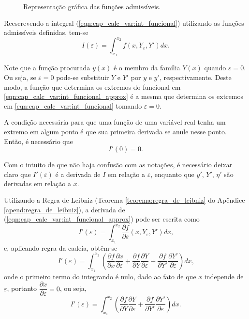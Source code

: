 \documentclass[
	12pt,				%
	openright,			%
    twoside,			%
	a4paper,			%
	english,			%
	french,				%
	spanish,			%
	brazil				%
	]{abntex2}
\numberwithin{lema}{chapter}
\numberwithin{teorema}{chapter}
\numberwithin{definicao}{chapter}
\numberwithin{exemplo}{chapter}
\numberwithin{figure}{chapter}
\begin{document}
\begin{figure}[!h]
	\caption{Representação gráfica das funções admissíveis.}
	\centering
	
	\resizebox{0.75\textwidth}{!}
	{
		
	}
	
	\label{fig:funcoes_admissiveis}
\end{figure}

Reescrevendo a integral (\ref{eqn:cap_calc_var:int_funcional}) utilizando as funções admissíveis definidas, tem-se
\begin{equation}\label{eqn:cap_calc_var:int_funcional_approx}
I(\varepsilon)=\int_{x_1}^{x_2}f(x, Y_{\varepsilon}, Y')dx\text{.}
\end{equation}

Note que a função procurada $y(x)$ é o membro da família $Y(x)$ quando $\varepsilon = 0$. Ou seja, se $\varepsilon = 0$ pode-se substituir $Y$ e $Y'$ por $y$ e $y'$, respectivamente. Deste modo, a função que determina os extremos do funcional em \eqref{eqn:cap_calc_var:int_funcional_approx} é a mesma que determina os extremos em \eqref{eqn:cap_calc_var:int_funcional} tomando $\varepsilon=0$.

A condição necessária para que uma função de uma variável real tenha um extremo em algum ponto é que sua primeira derivada se anule nesse ponto. Então, é necessário que
\begin{equation}\label{eqn:cap_calc_var:extrem_condition}
	I'(0)=0\text{.}
\end{equation}

Com o intuito de que não haja confusão com as notações, é necessário deixar claro que $I'(\varepsilon)$ é a derivada de $I$ em relação a $\varepsilon$, enquanto que $y'$, $Y'$, $\eta'$ são derivadas em relação a $x$.


Utilizando a Regra de Leibniz (Teorema \ref{teorema:regra_de_leibniz} do Apêndice \ref{apend:regra_de_leibniz}), a derivada de (\ref{eqn:cap_calc_var:int_funcional_approx}) pode ser escrita como
$$I'(\varepsilon)=\int_{x_1}^{x_2} \frac{\partial f}{\partial \varepsilon} (x, Y_{\varepsilon}, Y') dx \text{,}$$
e, aplicando regra da cadeia, obtêm-se
$$I'(\varepsilon)=\int_{x_1}^{x_2}\left ( \frac{\partial f}{\partial x}\frac{\partial x}{\partial \varepsilon} + \frac{\partial f}{\partial Y} \frac{\partial Y}{\partial \varepsilon} + \frac{\partial f}{\partial Y'} \frac{\partial Y'}{\partial \varepsilon} \right )dx\text{,}$$
onde o primeiro termo do integrando é nulo, dado ao fato de que $x$ independe de $\varepsilon$, portanto $\dfrac{\partial x}{\partial \varepsilon}=0$, ou seja,
\begin{equation}\label{eqn:cap_calc_var:chain_rule}
I'(\varepsilon)=\int_{x_1}^{x_2}\left ( \frac{\partial f}{\partial Y}\frac{\partial Y}{\partial \varepsilon} + \frac{\partial f}{\partial Y'}\frac{\partial Y'}{\partial \varepsilon} \right ) dx \text{.}
\end{equation}
\end{document}
